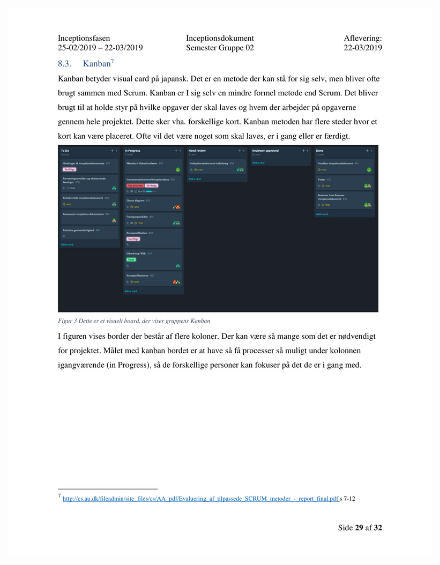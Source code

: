 \begin{figure}[hb]
  \includegraphics[scale = 0.33]{./PNG/Inceptions/Gruppe02+InceptionsDokument-30.jpg} 
\end{figure}

